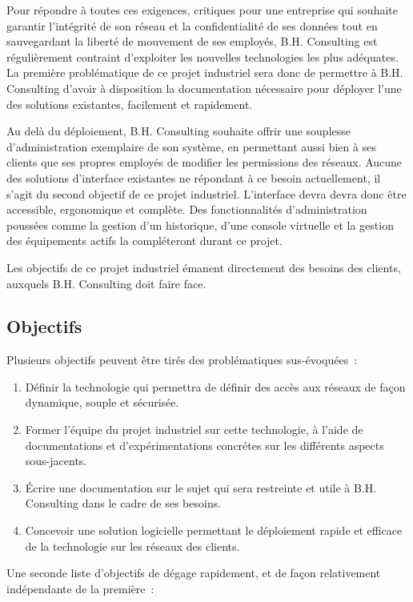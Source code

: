 Pour répondre à toutes ces exigences, critiques pour une entreprise qui souhaite garantir l'intégrité de son réseau et la confidentialité de ses données tout en sauvegardant la liberté de mouvement de ses employés, B.H. Consulting est régulièrement contraint d'exploiter les nouvelles technologies les plus adéquates. La première problématique de ce projet industriel sera donc de permettre à B.H. Consulting d'avoir à disposition la documentation nécessaire pour déployer l'une des solutions existantes, facilement et rapidement.

Au delà du déploiement, B.H. Consulting souhaite offrir une souplesse d'administration exemplaire de son système, en permettant aussi bien à ses clients que ses propres employés de modifier les permissions des réseaux. Aucune des solutions d'interface existantes ne répondant à ce besoin actuellement, il s'agit du second objectif de ce projet industriel. L'interface devra devra donc être accessible, ergonomique et complète. Des fonctionnalités d'administration poussées comme la gestion d'un historique, d'une console virtuelle et la gestion des équipements actifs la compléteront durant ce projet.

Les objectifs de ce projet industriel émanent directement des besoins des clients, auxquels B.H. Consulting doit faire face.

\subsection{Objectifs}

Plusieurs objectifs peuvent être tirés des problématiques sus-évoquées~:

\begin{enumerate}
\item Définir la technologie qui permettra de définir des accès aux réseaux de façon dynamique, souple et sécurisée.
\item Former l'équipe du projet industriel sur cette technologie, à l'aide de documentations et d'expérimentations concrétes sur les différents aspects sous-jacents.
\item Écrire une documentation sur le sujet qui sera restreinte et utile à B.H. Consulting dans le cadre de ses besoins.
\item Concevoir une solution logicielle permettant le déploiement rapide et efficace de la technologie sur les réseaux des clients.
\end{enumerate}

Une seconde liste d'objectifs de dégage rapidement, et de façon relativement indépendante de la première~:

